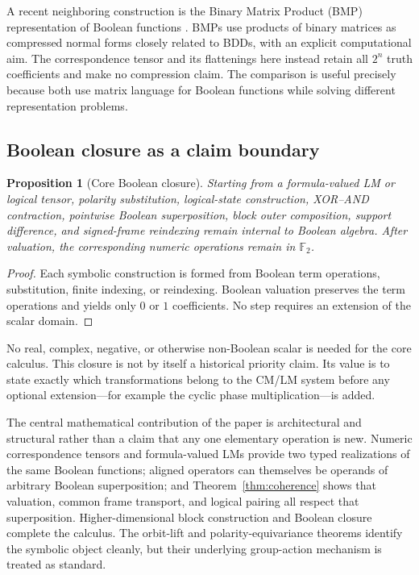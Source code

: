 \documentclass[11pt]{article}
\newtheorem{proposition}[theorem]{Proposition}
\theoremstyle{definition}
\theoremstyle{remark}
\newcommand{\F}{\mathbb F}
\begin{document}
A recent neighboring construction is the Binary Matrix Product (BMP) representation of Boolean functions \cite{Usturali2025}.  BMPs use products of binary matrices as compressed normal forms closely related to BDDs, with an explicit computational aim.  The correspondence tensor and its flattenings here instead retain all $2^n$ truth coefficients and make no compression claim.  The comparison is useful precisely because both use matrix language for Boolean functions while solving different representation problems.

\subsection{Boolean closure as a claim boundary}
\begin{proposition}[Core Boolean closure]
Starting from a formula-valued LM or logical tensor, polarity substitution, logical-state construction, XOR--AND contraction, pointwise Boolean superposition, block outer composition, support difference, and signed-frame reindexing remain internal to Boolean algebra.  After valuation, the corresponding numeric operations remain in $\F_2$.
\end{proposition}
\begin{proof}
Each symbolic construction is formed from Boolean term operations, substitution, finite indexing, or reindexing.  Boolean valuation preserves the term operations and yields only $0$ or $1$ coefficients.  No step requires an extension of the scalar domain.
\end{proof}
No real, complex, negative, or otherwise non-Boolean scalar is needed for the core calculus.  This closure is not by itself a historical priority claim.  Its value is to state exactly which transformations belong to the CM/LM system before any optional extension---for example the cyclic phase multiplication---is added.

The central mathematical contribution of the paper is architectural and structural rather than a claim that any one elementary operation is new.  Numeric correspondence tensors and formula-valued LMs provide two typed realizations of the same Boolean functions; aligned operators can themselves be operands of arbitrary Boolean superposition; and Theorem~\ref{thm:coherence} shows that valuation, common frame transport, and logical pairing all respect that superposition.  Higher-dimensional block construction and Boolean closure complete the calculus.  The orbit-lift and polarity-equivariance theorems identify the symbolic object cleanly, but their underlying group-action mechanism is treated as standard.
\end{document}
